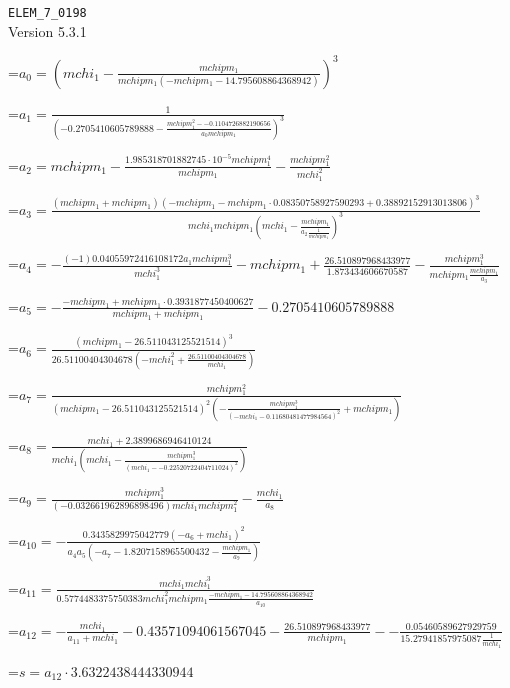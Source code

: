 \documentclass{article}
\newcommand{\exprline}[1]{\par\noindent\begingroup\setbox0=\hbox{$\displaystyle #1$}\ifdim\wd0>\linewidth\resizebox{\linewidth}{!}{\box0}\else\box0\fi\endgroup\par\medskip}
\begin{document}
\noindent\texttt{ELEM\_7\_0198}\\
Version 5.3.1\\
\exprline{a_{0} = \left(mchi_{1} - \frac{mchipm_{1}}{mchipm_{1} \left(- mchipm_{1} - 14.795608864368942\right)}\right)^{3}}
\exprline{a_{1} = \frac{1}{\left(-0.2705410605789888 - \frac{mchipm_{1}^{2} - -0.1104726882190656}{a_{0} mchipm_{1}}\right)^{3}}}
\exprline{a_{2} = mchipm_{1} - \frac{1.985318701882745 \cdot 10^{-5} mchipm_{1}^{4}}{mchipm_{1}} - \frac{mchipm_{1}^{2}}{mchi_{1}^{2}}}
\exprline{a_{3} = \frac{\left(mchipm_{1} + mchipm_{1}\right) \left(- mchipm_{1} - mchipm_{1} \cdot 0.08350758927590293 + 0.38892152913013806\right)^{3}}{mchi_{1} mchipm_{1} \left(mchi_{1} - \frac{mchipm_{1}}{a_{2} \frac{1}{mchipm_{1}}}\right)^{3}}}
\exprline{a_{4} = - \frac{\left(-1\right) 0.04055972416108172 a_{1} mchipm_{1}^{3}}{mchi_{1}^{3}} - mchipm_{1} + \frac{26.510897968433977}{1.873434606670587} - \frac{mchipm_{1}^{3}}{mchipm_{1} \frac{mchipm_{1}}{a_{3}}}}
\exprline{a_{5} = - \frac{- mchipm_{1} + mchipm_{1} \cdot 0.3931877450400627}{mchipm_{1} + mchipm_{1}} - 0.2705410605789888}
\exprline{a_{6} = \frac{\left(mchipm_{1} - 26.511043125521514\right)^{3}}{26.51100404304678 \left(- mchi_{1}^{2} + \frac{26.51100404304678}{mchi_{1}}\right)}}
\exprline{a_{7} = \frac{mchipm_{1}^{2}}{\left(mchipm_{1} - 26.511043125521514\right)^{2} \left(- \frac{mchipm_{1}^{3}}{\left(- mchi_{1} - 0.11680481477984564\right)^{2}} + mchipm_{1}\right)}}
\exprline{a_{8} = \frac{mchi_{1} + 2.3899686946410124}{mchi_{1} \left(mchi_{1} - \frac{mchipm_{1}^{3}}{\left(mchi_{1} - -0.22520722404711024\right)^{2}}\right)}}
\exprline{a_{9} = \frac{mchipm_{1}^{3}}{\left(-0.032661962896898496\right) mchi_{1} mchipm_{1}^{2}} - \frac{mchi_{1}}{a_{8}}}
\exprline{a_{10} = - \frac{0.3435829975042779 \left(- a_{6} + mchi_{1}\right)^{2}}{a_{4} a_{5} \left(- a_{7} - 1.8207158965500432 - \frac{mchipm_{1}}{a_{9}}\right)}}
\exprline{a_{11} = \frac{mchi_{1} mchi_{1}^{3}}{0.5774483375750383 mchi_{1}^{2} mchipm_{1} \frac{- mchipm_{1} - 14.795608864368942}{a_{10}}}}
\exprline{a_{12} = - \frac{mchi_{1}}{a_{11} + mchi_{1}} - 0.43571094061567045 - \frac{26.510897968433977}{mchipm_{1}} - - \frac{0.05460589627929759}{15.27941857975087 \frac{1}{mchi_{1}}}}
\exprline{s = a_{12} \cdot 3.6322438444330944}
\end{document}
